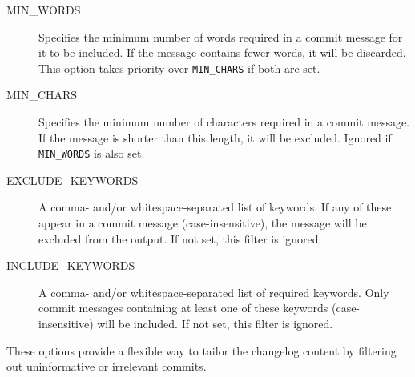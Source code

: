 \begin{description}
	\item[MIN\_WORDS] Specifies the minimum number of words required in a commit message for it to be included. If the message contains fewer words, it will be discarded. This option takes priority over \texttt{MIN\_CHARS} if both are set.
	
	\item[MIN\_CHARS] Specifies the minimum number of characters required in a commit message. If the message is shorter than this length, it will be excluded. Ignored if \texttt{MIN\_WORDS} is also set.
	
	\item[EXCLUDE\_KEYWORDS] A comma- and/or whitespace-separated list of keywords. If any of these appear in a commit message (case-insensitive), the message will be excluded from the output. If not set, this filter is ignored.
	
	\item[INCLUDE\_KEYWORDS] A comma- and/or whitespace-separated list of required keywords. Only commit messages containing at least one of these keywords (case-insensitive) will be included. If not set, this filter is ignored.
\end{description}

These options provide a flexible way to tailor the changelog content by filtering out uninformative or irrelevant commits.


